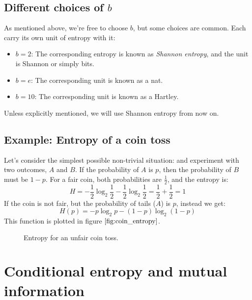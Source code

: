 \documentclass[12pt, a4paper]{article}
\numberwithin{equation}{section}
\begin{document}
\subsection{Different choices of $b$}
As mentioned above, we're free to choose $b$, but some choices are common. Each carry its own unit of entropy with it:
\begin{itemize}
\item $b=2$: The corresponding entropy is known as \textit{Shannon entropy}, and the unit is Shannon or simply bits.
\item $b=e$: The corresponding unit is known as a nat.
\item $b=10$: The corresponding unit is known as a Hartley.
\end{itemize}
Unless explicitly mentioned, we will use Shannon entropy from now on.

\subsection{Example: Entropy of a coin toss}
Let's consider the simplest possible non-trivial situation: and experiment with two outcomes, $A$ and $B$. If the probability of $A$ is $p$, then the probability of $B$ must be $1-p$.
For a fair coin, both probabilities are $\frac{1}{2}$, and the entropy is:
\begin{equation}
H=-\frac{1}{2}\log_2\frac{1}{2}-\frac{1}{2}\log_2\frac{1}{2}=\frac{1}{2}+\frac{1}{2}=1
\end{equation}
If the coin is not fair, but the probability of tails ($A$) is $p$, instead we get:
\begin{equation}
H(p)=-p\log_2 p-(1-p)\log_2(1-p)
\end{equation}
This function is plotted in figure $\ref{fig:coin_entropy}$.

\begin{figure}
\centering
{}
\caption{Entropy for an unfair coin toss.}
\label{fig:coin_entropy}
\end{figure}

\section{Conditional entropy and mutual information}
\end{document}
